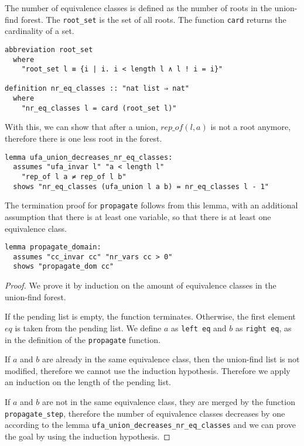 The number of equivalence classes is defined as the number of roots in the union-find forest. The \lstinline|root_set| is the set of all roots. The function \lstinline|card| returns the cardinality of a set.

\begin{lstlisting}
abbreviation root_set
  where
    "root_set l ≡ {i | i. i < length l ∧ l ! i = i}"

definition nr_eq_classes :: "nat list ⇒ nat"
  where
    "nr_eq_classes l = card (root_set l)"
\end{lstlisting}

With this, we can show that after a union, $rep\_of (l, a)$ is not a root anymore, therefore there is one less root in the forest.

\begin{lstlisting}
lemma ufa_union_decreases_nr_eq_classes:
  assumes "ufa_invar l" "a < length l"
    "rep_of l a ≠ rep_of l b"
  shows "nr_eq_classes (ufa_union l a b) = nr_eq_classes l - 1"
\end{lstlisting}

The termination proof for \lstinline{propagate} follows from this lemma, with an additional assumption that there is at least one variable, so that there is at least one equivalence class.

\begin{lstlisting}
lemma propagate_domain:
  assumes "cc_invar cc" "nr_vars cc > 0"
  shows "propagate_dom cc"
\end{lstlisting}

\begin{proof}
We prove it by induction on the amount of equivalence classes in the union-find forest.

If the pending list is empty, the function terminates. Otherwise, the first element $eq$ is taken from the pending list. We define $a$ as \lstinline{left eq} and $b$ as \lstinline{right eq}, as in the definition of the \lstinline|propagate| function.

If $a$ and $b$ are already in the same equivalence class, then the union-find list is not modified, therefore we cannot use the induction hypothesis. Therefore we apply an induction on the length of the pending list.

If $a$ and $b$ are not in the same equivalence class, they are merged by the function \lstinline{propagate_step}, therefore the number of equivalence classes decreases by one according to the lemma \lstinline{ufa_union_decreases_nr_eq_classes} and we can prove the goal by using the induction hypothesis.
\end{proof}

